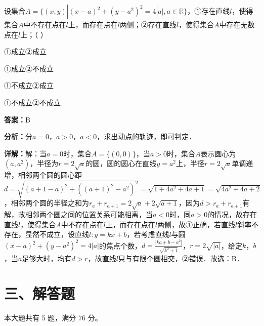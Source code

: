 \begin{question}[points=5]
设集合$A=\{(x,y)|(x-a)^2+(y-a^2)^2=4|a|, a\in\mathbb{R}\}$，①存在直线$l$，使得集合$A$中不存在点在$l$上，而存在点在$l$两侧；②存在直线$l$，使得集合$A$中存在无数点在$l$上；（ ）
\begin{choices}
  \item ①成立②成立
  \item ①成立②不成立
  \item ①不成立②成立
  \item ①不成立②不成立
\end{choices}
\begin{solution}
\textbf{答案：}B

\textbf{分析：}分$a=0$，$a>0$，$a<0$，求出动点的轨迹，即可判定．

\textbf{详解：}解：当$a=0$时，集合$A=\{(0,0)\}$，当$a>0$时，集合$A$表示圆心为$(a,a^2)$，半径为$r=2\sqrt{a}$的圆，圆的圆心在直线$y=a^2$上，半径$r=2\sqrt{a}$单调递增，相邻两个圆的圆心距$d=\sqrt{(a+1-a)^2+((a+1)^2-a^2)^2}=\sqrt{1+4a^2+4a+1}=\sqrt{4a^2+4a+2}$，相邻两个圆的半径之和为$r_{a}+r_{a+1}=2\sqrt{a}+2\sqrt{a+1}$，因为$d>r_{a}+r_{a+1}$有解，故相邻两个圆之间的位置关系可能相离，当$a<0$时，同$a>0$的情况，故存在直线$l$，使得集合$A$中不存在点在$l$上，而存在点在$l$两侧，故①正确，若直线$l$斜率不存在，显然不成立，设直线$l:y=kx+b$，若考虑直线$l$与圆$(x-a)^2+(y-a^2)^2=4|a|$的焦点个数，$d=\frac{|ka+b-a^2|}{\sqrt{k^2+1}}$，$r=2\sqrt{|a|}$，给定$k$，$b$，当$a$足够大时，均有$d>r$，故直线$l$只与有限个圆相交，②错误．故选：B．
\end{solution}
\end{question}

\section*{三、解答题}
本大题共有 5 题，满分 76 分。

